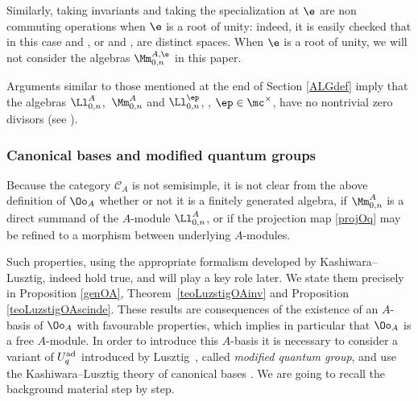 Similarly, taking invariants and taking the specialization at $\e$ are non commuting operations when $\e$ is a root of unity: indeed, it is easily checked that in this case  and , or  and , are distinct spaces. When $\e$ is a root of unity, we will not consider the algebras $\Mm_{0,n}^{A,\e}$ in this paper.

Arguments similar to those mentioned at the end of Section \ref{ALGdef} imply that the algebras $\Ll_{0,n}^A$,~$\Mm_{0,n}^A$ and $\Ll_{0,n}^\ep$, , $\ep\in \mc^\times$, have no nontrivial zero divisors (see \cite[Propositions~6.11 and~6.30]{BR}).

\subsubsection{Canonical bases and modified quantum groups} \label{canbasemodqg} Because the category $\mathcal{C}_A$ is not semisimple, it is not clear from the above definition of $\Oo_A$ whether or not it is a finitely generated algebra, if $\Mm_{0,n}^A$ is a direct summand of the $A$-module $\Ll_{0,n}^A$, or if the projection map \eqref{projOq} may be refined to a morphism between underlying $A$-modules.

Such properties, using the appropriate formalism developed by Kashiwara--Lusztig, indeed hold true, and will play a key role later. We state them precisely in Proposition \ref{genOA}, Theorem~\ref{teoLuzstigOAinv} and Proposition \ref{teoLuzstigOAscinde}. These results are consequences of the existence of an $A$-basis of $\Oo_A$ with favourable properties, which implies in particular that $\Oo_A$ is a free $A$-module. In order to introduce this $A$-basis it is necessary to consider a variant of $U_q^{\rm ad}$ introduced by Lusztig~\cite{Lusztig}, called {\it modified quantum group}, and use the Kashiwara--Lusztig theory of canonical bases \cite{Kashiwara1,Kashiwara2,Kashiwara3,Lusztig}. We are going to recall the background material step by step.

